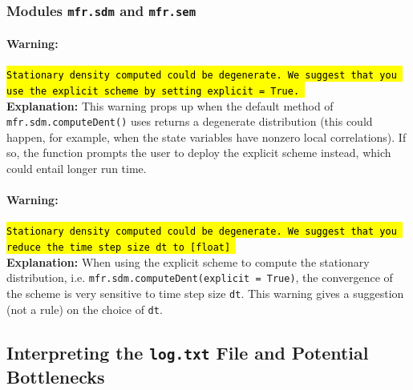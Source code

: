 \documentclass[12pt]{article}
\newcommand{\sdmProg}{mfr.sdm\xspace}
\newcommand{\semProg}{mfr.sem\xspace}
\begin{document}
\subsubsection{Modules \texttt{\sdmProg} and \texttt{\semProg}}

\paragraph{Warning:} \hl{\texttt{Stationary density computed could be degenerate. We suggest that you use the explicit scheme by setting explicit = True.
}}\\

\textbf{Explanation:} This warning props up when the default method of \texttt{\sdmProg.computeDent()} uses returns a degenerate distribution (this could happen, for example, when the state variables have nonzero local correlations). If so, the function prompts the user to deploy the explicit scheme instead, which could entail longer run time.

\paragraph{Warning:} \hl{\texttt{Stationary density computed could be degenerate. We suggest that you reduce the time step size dt to [float]
}}\\

\textbf{Explanation:} When using the explicit scheme to compute the stationary distribution, i.e. \texttt{\sdmProg.computeDent(explicit = True)}, the convergence of the scheme is very sensitive to time step size \texttt{dt}. This warning gives a suggestion (not a rule) on the choice of \texttt{dt}.

\subsection{Interpreting the \texttt{log.txt} File and Potential Bottlenecks}\label{sec:logfile}
\end{document}

